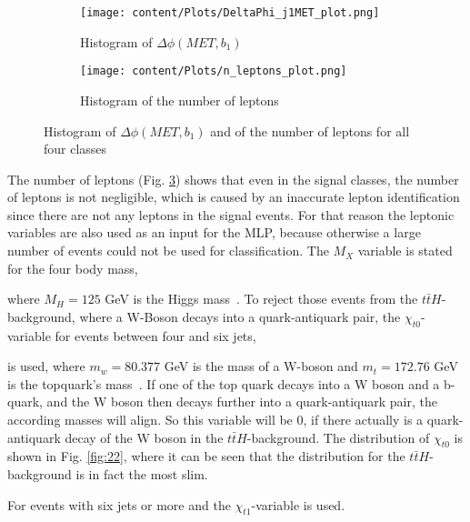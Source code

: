 \begin{figure}[H]
    \centering
    \begin{subfigure}{0.45\textwidth}
        \centering
        \texttt{[image: content/Plots/DeltaPhi\_j1MET\_plot.png]}
        \caption{Histogram of $\Delta \phi (MET, b_1)$}
        \label{fig:roc1}
    \end{subfigure}
    \hfill
    \begin{subfigure}{0.45\textwidth}
        \centering
        \texttt{[image: content/Plots/n\_leptons\_plot.png]}
        \caption{Histogram of the number of leptons}
        \label{fig:roc2}
    \end{subfigure}
    \caption{Histogram of $\Delta \phi (MET, b_1)$ and of the number of leptons for all four classes}
    \label{fig:21}
\end{figure}

The number of leptons (Fig. \ref{fig:21}) shows that even in the signal classes, the number of leptons is not negligible, which is caused by an inaccurate lepton identification since
there are not any leptons in the signal events. For that reason the leptonic variables are also used as an input for the MLP, because otherwise a large number of events could not be used for classification.
The $M_X$ variable is stated for the four body mass,


where $M_H = 125$ GeV is the Higgs mass~\cite{Run2analysisnote}. To reject those events from the $t \bar{t}H$-background, where a W-Boson decays into a quark-antiquark pair, the $\chi_{t0}$-variable for events between four and six jets,


is used, where $m_w=80.377$ GeV is the mass of a W-boson and $m_t=172.76$ GeV is the topquark's mass~\cite{Run2analysisnote}.
If one of the top quark decays into a W boson and a b-quark, and the W boson then decays further into a quark-antiquark pair, the according masses will align. So this variable 
will be $0$, if there actually is a quark-antiquark decay of the W boson in the $t \bar{t}H$-background. The distribution of $\chi_{t0}$ is shown in Fig. \ref{fig:22}, where it can
be seen that the distribution for the $t \bar{t}H$-background is in fact the most slim.

For events with six jets or more and the $\chi_{t1}$-variable is used.

